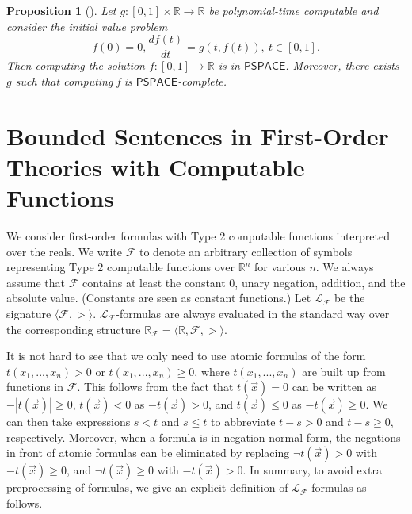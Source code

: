 \documentclass[conference]{IEEEtran}
\newtheorem{proposition}[theorem]{Proposition}
\begin{document}
\begin{proposition}[\cite{Kawamura09}]
Let $g:[0,1]\times \mathbb{R}\rightarrow \mathbb{R}$ be polynomial-time computable and consider the initial value problem 
$$f(0) = 0, \frac{df(t)}{dt} = g(t, f(t)),\ t\in [0,1].$$
Then computing the solution $f:[0,1]\rightarrow \mathbb{R}$ is in $\mathsf{PSPACE}$. Moreover, there exists $g$ such that computing f is $\mathsf{PSPACE}$-complete. 
\end{proposition}

\section{Bounded Sentences in First-Order Theories with Computable Functions}\label{logic}

We consider first-order formulas with Type 2 computable functions interpreted over the reals. We write $\mathcal{F}$ to denote an arbitrary collection of symbols representing Type 2 computable functions over $\mathbb{R}^n$ for various $n$. We always assume that $\mathcal{F}$ contains at least the constant $0$, unary negation, addition, and the absolute value. (Constants are seen as constant functions.) Let $\mathcal{L_{\mathcal{F}}}$ be the signature $\langle \mathcal{F}, >\rangle$. $\mathcal{L}_{\mathcal{F}}$-formulas are always evaluated in the standard way over the corresponding structure $\mathbb{R}_{\mathcal{F}}= \langle \mathbb{R}, \mathcal{F}, >\rangle$.  

It is not hard to see that we only need to use atomic formulas of the form $t(x_1,...,x_n)>0$ or $t(x_1,...,x_n)\geq 0$, where $t(x_1,...,x_n)$ are built up from functions in $\mathcal{F}$. This follows from the fact that $t(\vec x)=0$ can be written as $-|t(\vec x)|\geq 0$, $t(\vec x)<0$ as $-t(\vec x)>0$, and $t(\vec x)\leq 0$ as $-t(\vec x)\geq 0$. We can then take expressions $s <t $ and $s \leq t$ to abbreviate $t - s > 0$ and $t - s \geq 0$, respectively. Moreover, when a formula is in negation normal form, the negations in front of atomic formulas can be eliminated by replacing $\neg t(\vec x) > 0$ with $-t(\vec x)\geq 0$, and $\neg t(\vec x)\geq 0$ with $-t(\vec x)>0$. In summary, to avoid extra preprocessing of formulas, we give an explicit definition of $\mathcal{L}_{\mathcal{F}}$-formulas as follows.
\end{document}
